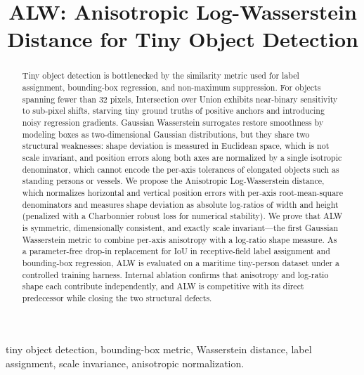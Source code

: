 \documentclass[journal]{IEEEtran}
\begin{document}
\title{ALW: Anisotropic Log-Wasserstein Distance for Tiny Object Detection}

\author{
}

\maketitle

\begin{abstract}
Tiny object detection is bottlenecked by the similarity metric used for
label assignment, bounding-box regression, and non-maximum suppression. For
objects spanning fewer than 32 pixels, Intersection over Union exhibits
near-binary sensitivity to sub-pixel shifts, starving tiny ground truths of
positive anchors and introducing noisy regression gradients. Gaussian
Wasserstein surrogates restore smoothness by modeling boxes as two-dimensional
Gaussian distributions, but they share two structural weaknesses: shape
deviation is measured in Euclidean space, which is not scale invariant, and
position errors along both axes are normalized by a single isotropic
denominator, which cannot encode the per-axis tolerances of elongated objects
such as standing persons or vessels. We propose the Anisotropic
Log-Wasserstein distance, which normalizes horizontal and vertical position
errors with per-axis root-mean-square denominators and measures shape
deviation as absolute log-ratios of width and height (penalized with a Charbonnier
robust loss for numerical stability). We prove that ALW is
symmetric, dimensionally consistent, and exactly scale invariant---the first
Gaussian Wasserstein metric to combine per-axis anisotropy with a
log-ratio shape measure. As a parameter-free drop-in replacement for IoU in receptive-field label
assignment and bounding-box regression, ALW is evaluated on a maritime
tiny-person dataset under a controlled training harness. Internal ablation
confirms that anisotropy and log-ratio shape each contribute independently,
and ALW is competitive with its direct predecessor while closing the two
structural defects.
\end{abstract}

\begin{IEEEkeywords}
tiny object detection, bounding-box metric, Wasserstein distance, label
assignment, scale invariance, anisotropic normalization.
\end{IEEEkeywords}
\end{document}
